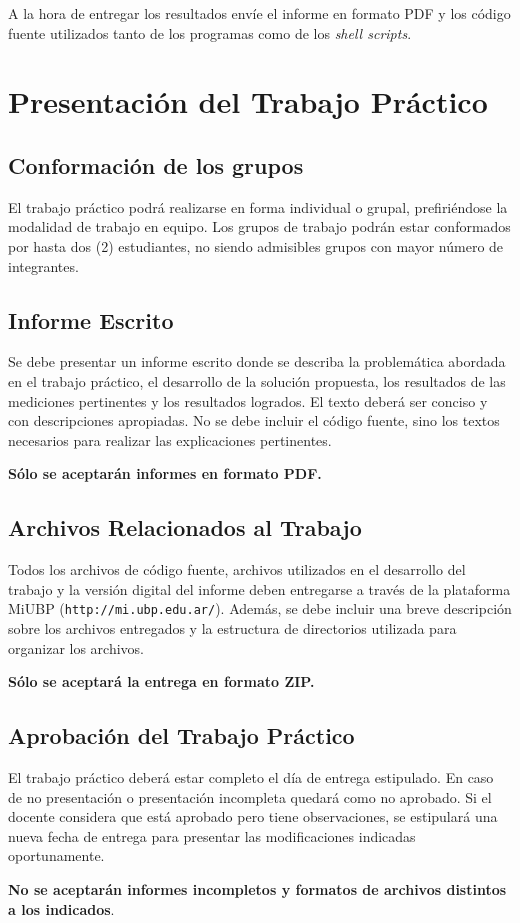 \documentclass[a4paper,11pt]{article}
\begin{document}
A la hora de entregar los resultados envíe el informe en formato PDF y
los código fuente utilizados tanto de los programas como de los \emph{shell scripts}.

\newpage

\section*{Presentación del Trabajo Práctico}

\subsection*{Conformación de los grupos}

El trabajo práctico podrá realizarse en forma individual o grupal,
prefiriéndose la modalidad de trabajo en equipo.  Los grupos de
trabajo podrán estar conformados por hasta dos (2) estudiantes, no
siendo admisibles grupos con mayor número de integrantes.


\subsection*{Informe Escrito}

Se debe presentar un informe escrito donde se describa la problemática
abordada en el trabajo práctico, el desarrollo de la solución
propuesta, los resultados de las mediciones pertinentes y los
resultados logrados.  El texto deberá ser conciso y con descripciones
apropiadas.  No se debe incluir el código fuente, sino los textos
necesarios para realizar las explicaciones pertinentes.

\textbf{Sólo se aceptarán informes en formato PDF.}


\subsection*{Archivos Relacionados al Trabajo}

Todos los archivos de código fuente, archivos utilizados en el
desarrollo del trabajo y la versi\'on digital del informe deben
entregarse a través de la plataforma MiUBP (\verb|http://mi.ubp.edu.ar/|).
Además, se debe incluir una breve descripción sobre los archivos entregados
y la estructura de directorios utilizada para organizar los archivos.

\textbf{Sólo se aceptará la entrega en formato ZIP.}


\subsection*{Aprobación del Trabajo Práctico}

El trabajo práctico deberá estar completo el día de entrega
estipulado.  En caso de no presentación o presentación incompleta
quedará como no aprobado.  Si el docente considera que está aprobado
pero tiene observaciones, se estipulará una nueva fecha de entrega
para presentar las modificaciones indicadas oportunamente.

\textbf{No se aceptarán informes incompletos y formatos de archivos
  distintos a los indicados}.
\end{document}
